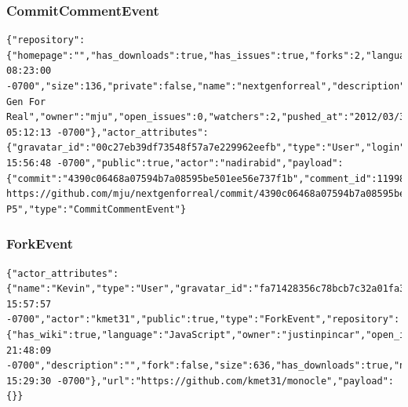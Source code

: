 \documentclass[a4paper,10pt]{article}
\begin{document}
\subsubsection{CommitCommentEvent}
\begin{lstlisting}
{"repository":{"homepage":"","has_downloads":true,"has_issues":true,"forks":2,"language":"Java","fork":false,"has_wiki":true,"url":"https://github.com/mju/nextgenforreal","created_at":"2012/03/29 08:23:00 -0700","size":136,"private":false,"name":"nextgenforreal","description":"Next Gen For Real","owner":"mju","open_issues":0,"watchers":2,"pushed_at":"2012/03/30 05:12:13 -0700"},"actor_attributes":{"gravatar_id":"00c27eb39df73548f57a7e229962eefb","type":"User","login":"nadirabid"},"created_at":"2012/04/11 15:56:48 -0700","public":true,"actor":"nadirabid","payload":{"commit":"4390c06468a07594b7a08595be501ee56e737f1b","comment_id":1199860},"url":"
https://github.com/mju/nextgenforreal/commit/4390c06468a07594b7a08595be501ee56e737f1b#war/SecLookup/lookup.html-P5","type":"CommitCommentEvent"}
\end{lstlisting}

\subsubsection{ForkEvent}
\begin{lstlisting}
{"actor_attributes":{"name":"Kevin","type":"User","gravatar_id":"fa71428356c78bcb7c32a01fa353657f","login":"kmet31"},"created_at":"2012/04/11 15:57:57 -0700","actor":"kmet31","public":true,"type":"ForkEvent","repository":{"has_wiki":true,"language":"JavaScript","owner":"justinpincar","open_issues":0,"url":"https://github.com/justinpincar/monocle","watchers":2,"pushed_at":"2012/04/07 21:48:09 -0700","description":"","fork":false,"size":636,"has_downloads":true,"name":"monocle","has_issues":true,"homepage":"","forks":2,"private":false,"created_at":"2012/04/06 15:29:30 -0700"},"url":"https://github.com/kmet31/monocle","payload":{}}
\end{lstlisting}
\end{document}
